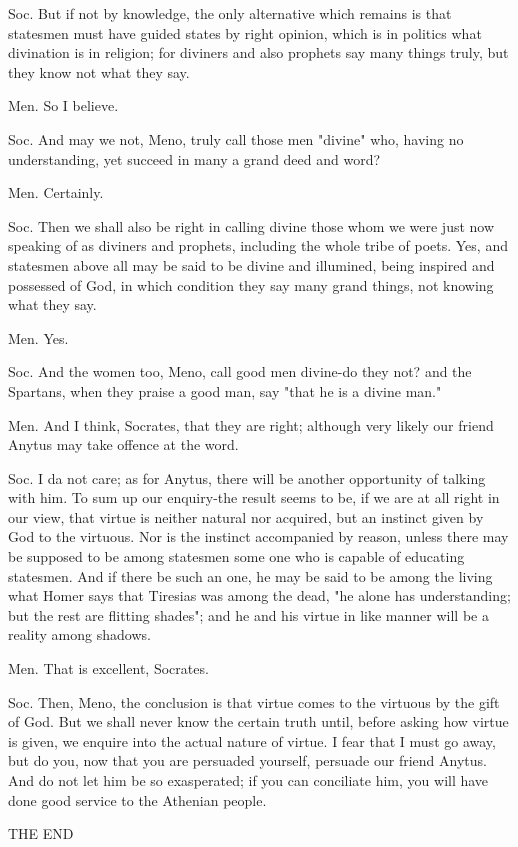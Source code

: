 Soc. But if not by knowledge, the only alternative which remains is
that statesmen must have guided states by right opinion, which is
in politics what divination is in religion; for diviners and also
prophets say many things truly, but they know not what they say.

Men. So I believe. 

Soc. And may we not, Meno, truly call those men "divine" who, having
no understanding, yet succeed in many a grand deed and word?

Men. Certainly. 

Soc. Then we shall also be right in calling divine those whom we were
just now speaking of as diviners and prophets, including the whole
tribe of poets. Yes, and statesmen above all may be said to be divine
and illumined, being inspired and possessed of God, in which condition
they say many grand things, not knowing what they say. 

Men. Yes. 

Soc. And the women too, Meno, call good men divine-do they not? and
the Spartans, when they praise a good man, say "that he is a divine
man." 

Men. And I think, Socrates, that they are right; although very likely
our friend Anytus may take offence at the word. 

Soc. I da not care; as for Anytus, there will be another opportunity
of talking with him. To sum up our enquiry-the result seems to be,
if we are at all right in our view, that virtue is neither natural
nor acquired, but an instinct given by God to the virtuous. Nor is
the instinct accompanied by reason, unless there may be supposed to
be among statesmen some one who is capable of educating statesmen.
And if there be such an one, he may be said to be among the living
what Homer says that Tiresias was among the dead, "he alone has understanding;
but the rest are flitting shades"; and he and his virtue in like manner
will be a reality among shadows. 

Men. That is excellent, Socrates. 

Soc. Then, Meno, the conclusion is that virtue comes to the virtuous
by the gift of God. But we shall never know the certain truth until,
before asking how virtue is given, we enquire into the actual nature
of virtue. I fear that I must go away, but do you, now that you are
persuaded yourself, persuade our friend Anytus. And do not let him
be so exasperated; if you can conciliate him, you will have done good
service to the Athenian people. 

THE END

